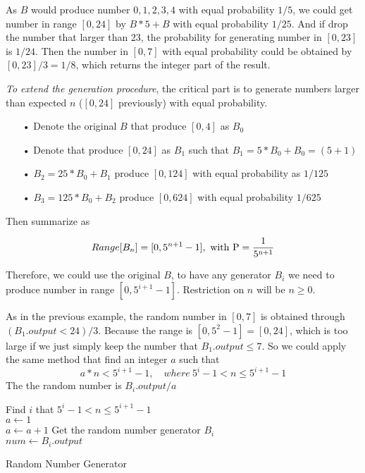 \documentclass{assignment}
\begin{document}
	\begin{homeworkProblem}
	As $B$ would produce number $0,1,2,3,4$ with equal probability $1/5$, we could get number in range $[0,24]$ by $B*5 + B$ with equal 	probability $1/25$. And if drop the number that larger than $23$, the probability for generating number in $[0, 23]$ is $1/24$. Then the number in $[0, 7]$  with equal probability could be obtained by $[0,23] / 3 = 1/8$, which returns the integer part of the result.
	
	\textit{To extend the generation procedure}, the critical part is to generate numbers larger than expected $n$ ($[0,24]$ previously) with equal probability. 
	\begin{enumerate}
	\item[•] Denote the original $B$ that produce $[0,4]$ as $B_0$
	\item[•] Denote that produce $[0,24]$ as $B_1$ such that $B_1=5*B_0 + B_0=(5+1)$
	\item[•] $B_2=25*B_0+B_1$ produce $[0, 124]$ with equal probability as $1/125$
	\item[•]$B_3=125*B_0 + B_2$ produce $[0, 624]$ with equal probability $1/625$
	\end{enumerate}

	Then summarize as 
	
	$$Range[B_n] = [0, 5^{n+1}-1],\ \rm{with}\ P=\frac{1}{5^{n+1}}$$
	
	Therefore, we could use the original $B$, to have any generator $B_i$ we need  to produce number in range $[0, 5^{i+1}-1]$. Restriction on $n$ will be $n\geq 0$. 
	
As in the previous example, the random number in $[0,7]$ is obtained through $(B_1.output<24)/3$. Because the range is $[0, 5^2-1]=[0, 24]$, which is too large if we just simply keep the number that $B_1.output \leq 7$. So we could apply the same method that find an integer $a$ such that 
		$$ a*n < 5^{i+1}-1, \quad where\ 5^{i} -1 < n \leq 5^{i+1} -1$$
The the random number is $B_i.output/a$		
		
	\newpage 
	     \begin{algorithm}[H]
 \BlankLine
Find $i$ that $5^{i} -1 < n \leq 5^{i+1} -1$\\
$a\leftarrow 1$ \\

 {
$a \leftarrow a + 1$
}
Get the random number generator $B_i$  \\
$num \leftarrow B_i.output$ \\
\caption{Random Number Generator} \end{algorithm}
    
	
	\end{homeworkProblem}
\end{document}
